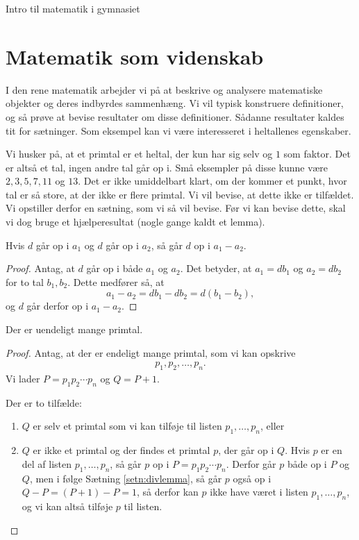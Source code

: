 

\begin{center}
\Huge
Intro til matematik i gymnasiet
\end{center}
\section*{Matematik som videnskab}


I den rene matematik arbejder vi på at beskrive og analysere matematiske objekter og deres indbyrdes sammenhæng. Vi vil typisk konstruere definitioner, og så prøve at bevise resultater om disse definitioner. Sådanne resultater kaldes tit for sætninger. Som eksempel kan vi være interesseret i heltallenes egenskaber.
\begin{exa}\label{exa:exa1}
Vi husker på, at et primtal er et heltal, der kun har sig selv og $1$ som faktor. Det er altså et tal, ingen andre tal går op i. Små eksempler på disse kunne være $2,3,5,7,11$ og $13$. Det er ikke umiddelbart klart, om der kommer et punkt, hvor tal er så store, at der ikke er flere primtal. Vi vil bevise, at dette ikke er tilfældet. Vi opstiller derfor en sætning, som vi så vil bevise. Før vi kan bevise dette, skal vi dog bruge et hjælperesultat (nogle gange kaldt et lemma).
\begin{setn}\label{setn:divlemma}
Hvis $d$ går op i $a_1$ og $d$ går op i $a_2$, så går $d$ op i $a_1-a_2$.
\end{setn}
\begin{proof}
Antag, at $d$ går op i både $a_1$ og $a_2$. Det betyder, at $a_1 = db_1$ og $a_2=db_2$ for to tal $b_1,b_2$. Dette medfører så, at  
\[
a_1-a_2 = db_1-db_2=d(b_1-b_2),
\]
og $d$ går derfor op i $a_1-a_2$.
\end{proof}
\begin{setn}
Der er uendeligt mange primtal. 
\end{setn}
\begin{proof}
Antag, at der er endeligt mange primtal, som vi kan opskrive
\begin{align*}
p_1,p_2,\hdots,p_n.
\end{align*}
Vi lader $P = p_1p_2\cdots p_n$ og $Q = P+1$.  

Der er to tilfælde:
\begin{enumerate}[label=\roman*)]
 \item$Q$ er selv et primtal som vi kan tilføje til listen $p_1,\hdots,p_n$, eller
 \item $Q$ er ikke et primtal og der findes et primtal $p$, der går op i $Q$. Hvis $p$ er en del af listen $p_1,\hdots,p_n$, så går $p$ op i $P=p_1p_2\cdots p_n$. Derfor går $p$ både op i $P$ og $Q$, men i følge Sætning \ref{setn:divlemma}, så går $p$ også op i $Q-P = (P+1)-P = 1$, så derfor kan $p$ ikke have været i listen $p_1,\hdots,p_n$, og vi kan altså tilføje $p$ til listen. 
\end{enumerate}
\end{proof}
\end{exa}
